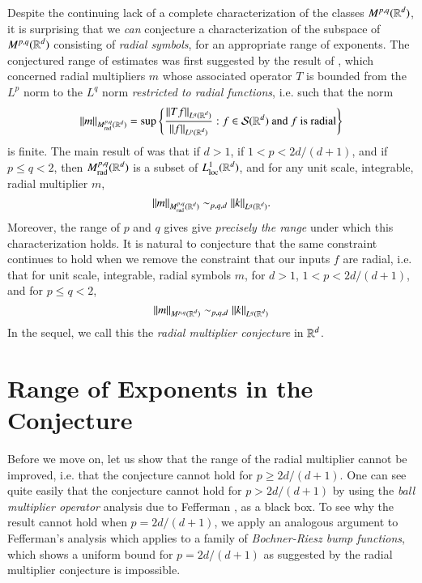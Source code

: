 Despite the continuing lack of a complete characterization of the classes $M^{p,q}(\operatorname{\mathbb{R}}^d)$, it is surprising that we \emph{can} conjecture a characterization of the subspace of $M^{p,q}(\operatorname{\mathbb{R}}^d)$ consisting of \emph{radial symbols}, for an appropriate range of exponents. The conjectured range of estimates was first suggested by the result of \cite{GarrigosandSeeger}, which concerned radial multipliers $m$ whose associated operator $T$ is bounded from the $L^p$ norm to the $L^q$ norm \emph{restricted to radial functions}, i.e. such that the norm
%
\[ \| m \|_{M^{p,q}_{\text{rad}}(\operatorname{\mathbb{R}}^d)} = \sup \left\{ \frac{\| Tf \|_{L^q(\operatorname{\mathbb{R}}^d)}}{\| f \|_{L^p(\operatorname{\mathbb{R}}^d)}} : f \in \mathcal{S}(\operatorname{\mathbb{R}}^d)\ \text{and $f$ is radial} \right\} \]
%
is finite. The main result of \cite{GarrigosandSeeger} was that if $d > 1$, if $1 < p < 2d/(d+1)$, and if $p \leq q < 2$, then $M^{p,q}_{\text{rad}}(\operatorname{\mathbb{R}}^d)$ is a subset of $L^1_{\text{loc}}(\operatorname{\mathbb{R}}^d)$, and for any unit scale, integrable, radial multiplier $m$,
%
\[ \| m \|_{M^{p,q}_{\text{rad}}(\operatorname{\mathbb{R}}^d)} \sim_{p,q,d} \| k \|_{L^q(\operatorname{\mathbb{R}}^d)}. \]
%
%
%
Moreover, the range of $p$ and $q$ gives give \emph{precisely the range} under which this characterization holds. It is natural to conjecture that the same constraint continues to hold when we remove the constraint that our inputs $f$ are radial, i.e. that for unit scale, integrable, radial symbols $m$, for $d > 1$, $1 < p < 2d/(d+1)$, and for $p \leq q < 2$,
%
\[ \| m \|_{M^{p,q}(\operatorname{\mathbb{R}}^d)} \sim_{p,q,d} \| k \|_{L^q(\operatorname{\mathbb{R}}^d)} \]
%
%
%
In the sequel, we call this the \emph{radial multiplier conjecture} in $\operatorname{\mathbb{R}}^d$.

\section{Range of Exponents in the Conjecture}

Before we move on, let us show that the range of the radial multiplier cannot be improved, i.e. that the conjecture cannot hold for $p \geq 2d/(d+1)$. One can see quite easily that the conjecture cannot hold for $p > 2d/(d+1)$ by using the \emph{ball multiplier operator} analysis due to Fefferman \cite{Fefferman}, as a black box. To see why the result cannot hold when $p = 2d/(d+1)$, we apply an analogous argument to Fefferman's analysis which applies to a family of \emph{Bochner-Riesz bump functions}, which shows a uniform bound for $p = 2d/(d+1)$ as suggested by the radial multiplier conjecture is impossible.

